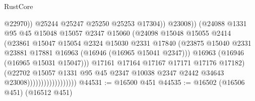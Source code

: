 \begin{lexlean}{RustCore}
\begin{coremodule}
                                                @22970))
                                            @25244
                                            @25247
                                            @25250
                                            @25253
                                            @17304))
                                        @23008))
                                    (@24088
                                      @1331
                                      @95
                                      @45
                                      @15048
                                      @15057
                                      @2347
                                      @15060
                                      (@24098
                                        @15048
                                        @15055
                                        @2414
                                        (@23861
                                          @15047
                                          @15054
                                          @2324
                                          @15030
                                          @2331
                                          @17840
                                          (@23875
                                            @15040
                                            @2331
                                            @23881
                                            @17881
                                            @16963
                                            (@16946 (@16965 @15041 @2347)))
                                          @16963
                                          (@16946 (@16965 @15031 @15047)))
                                        @17161
                                        @17164
                                        @17167
                                        @17171
                                        @17176
                                        @17182)
                                      (@22702
                                        @15057
                                        @1331
                                        @95
                                        @45
                                        @2347
                                        @10038
                                        @2347
                                        @2442
                                        @34643
                                        @23008))))))))))))))))))
@44531 := @16500 @451
@44535 := @16502 (@16506 @451) (@16512 @451)

\end{coremodule}
\end{lexlean}
